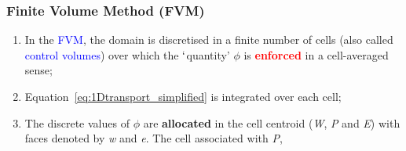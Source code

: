 \documentclass[10pt,compress,handout,ignorenonframetext]{beamer}
\begin{document}
\begin{frame}
 \frametitle{Finite Volume Method (FVM)} 

\begin{enumerate}
     \item <1-> In the \textcolor{blue}{FVM}, the domain is discretised in a finite number of cells (also called \textcolor{blue}{control volumes}) over which the $\lq$quantity' $\phi$ is \textcolor{red}{\bf enforced} in a cell-averaged sense;
     \item <2-> Equation~\ref{eq:1Dtransport_simplified} is integrated over each cell; 
     \item <3-> The discrete values of $\phi$ are {\bf allocated} in the cell centroid ({\it W}, {\it P} and {\it E}) with faces denoted by {\it w} and {\it e}. The cell associated with {\it P},
\end{enumerate}  
 
\end{frame}
\end{document}
